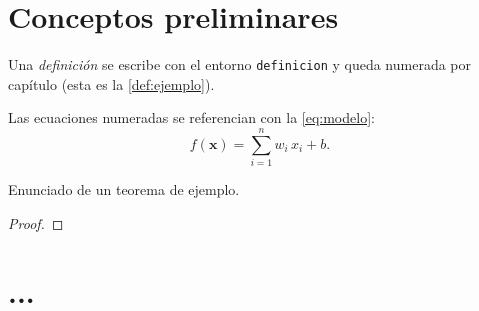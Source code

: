 
\section{Conceptos preliminares}
\begin{definicion}\label{def:ejemplo}
Una \emph{definición} se escribe con el entorno \texttt{definicion} y queda
numerada por capítulo (esta es la \cref{def:ejemplo}).
\end{definicion}

Las ecuaciones numeradas se referencian con la \cref{eq:modelo}:
\begin{equation}\label{eq:modelo}
  f(\mathbf{x}) = \sum_{i=1}^{n} w_i\, x_i + b .
\end{equation}

\begin{teorema}\label{teo:ejemplo}
Enunciado de un teorema de ejemplo.
\end{teorema}

\begin{proof}
\end{proof}

\section{...}
